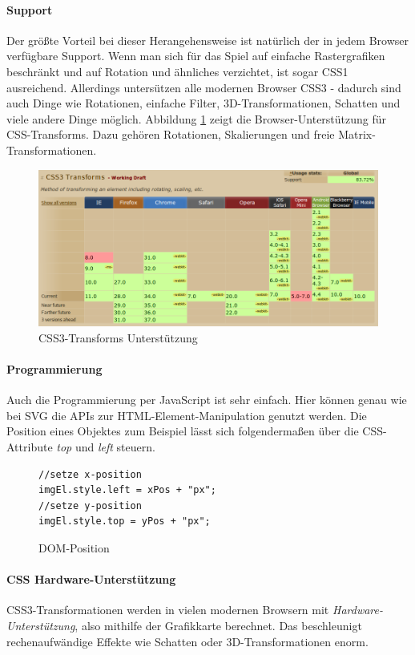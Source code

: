 \documentclass[a4paper, 12pt]{article}
\begin{document}
\paragraph{Support} Der größte Vorteil bei dieser Herangehensweise ist natürlich der in jedem Browser verfügbare Support. Wenn man sich für das Spiel auf einfache Rastergrafiken beschränkt und auf Rotation und ähnliches verzichtet, ist sogar CSS1 ausreichend. Allerdings untersützen alle modernen Browser CSS3 - dadurch sind auch Dinge wie Rotationen, einfache Filter, 3D-Transformationen, Schatten und viele andere Dinge möglich. Abbildung \ref{css_transforms_support} zeigt die Browser-Unterstützung für CSS-Transforms. Dazu gehören Rotationen, Skalierungen und freie Matrix-Transformationen. 
\begin{figure}[H]
	\begin{center}
		\includegraphics[width=\textwidth]{assets/css_transforms_support.png} 
	\end{center}
	\caption{CSS3-Transforms Unterstützung}
	\label{css_transforms_support}
\end{figure}
\paragraph{Programmierung} Auch die Programmierung per JavaScript ist sehr einfach. Hier können genau wie bei SVG die APIs zur HTML-Element-Manipulation genutzt werden. Die Position eines Objektes zum Beispiel lässt sich folgendermaßen über die CSS-Attribute \emph{top} und \emph{left} steuern.
\begin{figure}[H]
	\begin{verbatim}
//setze x-position
imgEl.style.left = xPos + "px";
//setze y-position
imgEl.style.top = yPos + "px";
	\end{verbatim}
	\caption{DOM-Position}
	\label{dom_position_example}
\end{figure}
\paragraph{CSS Hardware-Unterstützung} CSS3-Transformationen werden in vielen modernen Browsern mit \emph{Hardware-Unterstützung}, also mithilfe der Grafikkarte berechnet. Das beschleunigt rechenaufwändige Effekte wie Schatten oder 3D-Transformationen enorm.
\end{document}
